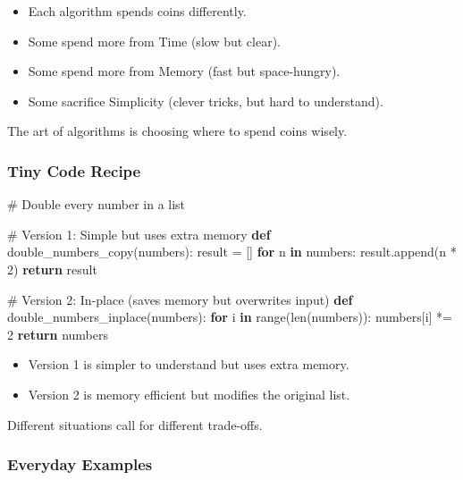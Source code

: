 \documentclass[
  letterpaper,
  DIV=11,
  numbers=noendperiod]{scrreprt}
\newenvironment{Shaded}{\begin{snugshade}}{\end{snugshade}}
\newcommand{\BuiltInTok}[1]{\textcolor[rgb]{0.00,0.23,0.31}{#1}}
\newcommand{\CommentTok}[1]{\textcolor[rgb]{0.37,0.37,0.37}{#1}}
\newcommand{\ControlFlowTok}[1]{\textcolor[rgb]{0.00,0.23,0.31}{\textbf{#1}}}
\newcommand{\DecValTok}[1]{\textcolor[rgb]{0.68,0.00,0.00}{#1}}
\newcommand{\KeywordTok}[1]{\textcolor[rgb]{0.00,0.23,0.31}{\textbf{#1}}}
\newcommand{\NormalTok}[1]{\textcolor[rgb]{0.00,0.23,0.31}{#1}}
\newcommand{\OperatorTok}[1]{\textcolor[rgb]{0.37,0.37,0.37}{#1}}
\providecommand{\tightlist}{%
  \setlength{\itemsep}{0pt}\setlength{\parskip}{0pt}}
\begin{document}
\begin{itemize}
\tightlist
\item
  Each algorithm spends coins differently.
\item
  Some spend more from Time (slow but clear).
\item
  Some spend more from Memory (fast but space-hungry).
\item
  Some sacrifice Simplicity (clever tricks, but hard to understand).
\end{itemize}

The art of algorithms is choosing where to spend coins wisely.

\subsubsection{Tiny Code Recipe}\label{tiny-code-recipe-7}

\begin{Shaded}
\begin{Highlighting}[]
\CommentTok{\# Double every number in a list}

\CommentTok{\# Version 1: Simple but uses extra memory}
\KeywordTok{def}\NormalTok{ double\_numbers\_copy(numbers):}
\NormalTok{    result }\OperatorTok{=}\NormalTok{ []}
    \ControlFlowTok{for}\NormalTok{ n }\KeywordTok{in}\NormalTok{ numbers:}
\NormalTok{        result.append(n }\OperatorTok{*} \DecValTok{2}\NormalTok{)}
    \ControlFlowTok{return}\NormalTok{ result}

\CommentTok{\# Version 2: In{-}place (saves memory but overwrites input)}
\KeywordTok{def}\NormalTok{ double\_numbers\_inplace(numbers):}
    \ControlFlowTok{for}\NormalTok{ i }\KeywordTok{in} \BuiltInTok{range}\NormalTok{(}\BuiltInTok{len}\NormalTok{(numbers)):}
\NormalTok{        numbers[i] }\OperatorTok{*=} \DecValTok{2}
    \ControlFlowTok{return}\NormalTok{ numbers}
\end{Highlighting}
\end{Shaded}

\begin{itemize}
\tightlist
\item
  Version 1 is simpler to understand but uses extra memory.
\item
  Version 2 is memory efficient but modifies the original list.
\end{itemize}

Different situations call for different trade-offs.

\subsubsection{Everyday Examples}\label{everyday-examples-6}
\end{document}
